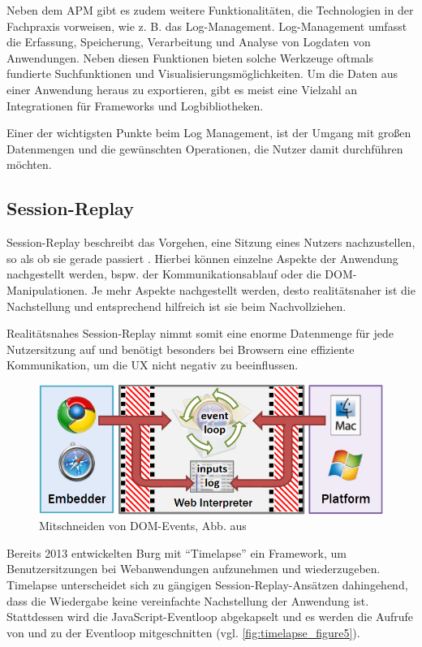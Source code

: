 Neben dem APM gibt es zudem weitere Funktionalitäten, die Technologien in der Fachpraxis vorweisen, wie z. B. das Log-Management. Log-Management umfasst die Erfassung, Speicherung, Verarbeitung und Analyse von Logdaten von Anwendungen. Neben diesen Funktionen bieten solche Werkzeuge oftmals fundierte Suchfunktionen und Visualisierungsmöglichkeiten. Um die Daten aus einer Anwendung heraus zu exportieren, gibt es meist eine Vielzahl an Integrationen für Frameworks und Logbibliotheken.

Einer der wichtigsten Punkte beim Log Management, ist der Umgang mit großen Datenmengen und die gewünschten Operationen, die Nutzer damit durchführen möchten.

\subsection{Session-Replay}

Session-Replay beschreibt das Vorgehen, eine Sitzung eines Nutzers nachzustellen, so als ob sie gerade passiert \cite{NoBoundariesExfiltrationBySessionReplayScripts}. Hierbei können einzelne Aspekte der Anwendung nachgestellt werden, bspw. der Kommunikationsablauf oder die DOM-Manipulationen. Je mehr Aspekte nachgestellt werden, desto realitätsnaher ist die Nachstellung und entsprechend hilfreich ist sie beim Nachvollziehen.

Realitätsnahes Session-Replay nimmt somit eine enorme Datenmenge für jede Nutzersitzung auf und benötigt besonders bei Browsern eine effiziente Kommunikation, um die UX nicht negativ zu beeinflussen.

\begin{figure}
\centering
\includegraphics[width=\linewidth]{img/03_methoden/timelapse_figure5.png}
\caption{Mitschneiden von DOM-Events, Abb. aus \cite{TimelapsePaper}}
\label{fig:timelapse_figure5}
\end{figure}

Bereits 2013 entwickelten Burg \etal \cite{TimelapsePaper} mit \enquote{Timelapse} ein Framework, um Benutzersitzungen bei Webanwendungen aufzunehmen und wiederzugeben. Timelapse unterscheidet sich zu gängigen Session-Replay-Ansätzen dahingehend, dass die Wiedergabe keine vereinfachte Nachstellung der Anwendung ist. Stattdessen wird die JavaScript-Eventloop abgekapselt und es werden die Aufrufe von und zu der Eventloop mitgeschnitten (vgl. \autoref{fig:timelapse_figure5}).

